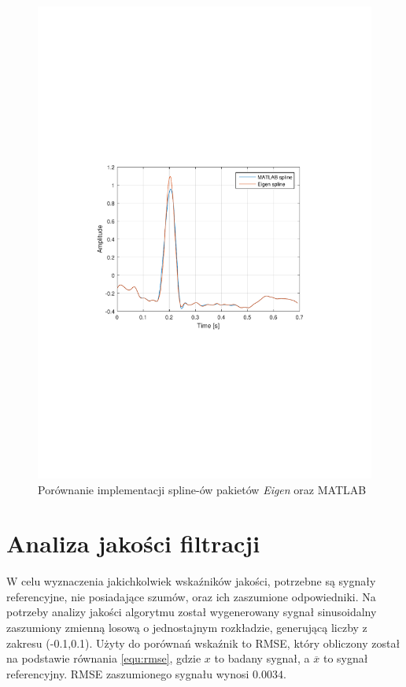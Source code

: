 \begin{figure}[!htb]
    \begin{center}
        \includegraphics[width=13cm,trim=4cm 9.5cm 4cm 10cm,clip]
        {../img/spline_comp.pdf}
    \end{center}
    \caption{Porównanie implementacji spline-ów pakietów \textit{Eigen} oraz
    \textrm{MATLAB}}
    \label{rys:comp_spline}
\end{figure}

\newpage

\section{Analiza jakości filtracji}
\indent

W celu wyznaczenia jakichkolwiek wskaźników jakości, potrzebne są sygnały
referencyjne, nie posiadające szumów, oraz ich zaszumione odpowiedniki. Na
potrzeby analizy jakości algorytmu został wygenerowany sygnał sinusoidalny
zaszumiony zmienną losową o jednostajnym rozkładzie, generującą liczby z zakresu
(-0.1,0.1). Użyty do porównań wskaźnik to RMSE, który obliczony został na
podstawie równania \eqref{equ:rmse}, gdzie $x$ to badany sygnał, a
$\overline{x}$ to sygnał referencyjny. RMSE zaszumionego sygnału wynosi
$0.0034$.

